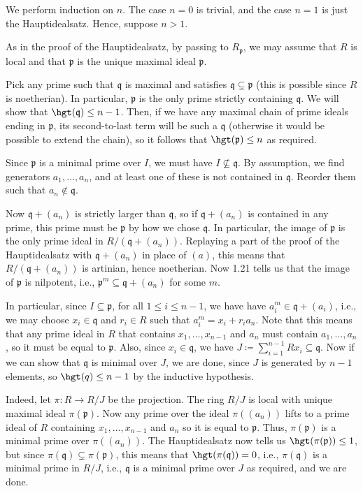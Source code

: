 We perform induction on $n$. The case $n = 0$ is trivial, and the case
$n = 1$ is just the Hauptidealsatz. Hence, suppose $n > 1$.

As in the proof of the Hauptidealsatz, by passing to $R_{\mathfrak{p}}$, we may
assume that $R$ is local and that $\mathfrak{p}$ is the unique maximal ideal
$\mathfrak{p}$.

Pick any prime such that $\mathfrak{q}$ is maximal and satisfies
$\mathfrak{q}\subsetneq \mathfrak{p}$ (this is possible since $R$ is noetherian).
In particular, $\mathfrak{p}$ is the only prime strictly containing $\mathfrak{q}$.
We will show that $\hgt(\mathfrak{q}) \leq n - 1$. Then, if we have any maximal
chain of prime ideals ending in $\mathfrak{p}$, its second-to-last term will be
such a  $\mathfrak{q}$ (otherwise it would be possible to extend the chain), so
it follows that $\hgt(\mathfrak{p})\leq n$ as required.

Since $\mathfrak{p}$ is a minimal prime over $I$, we must have $I \nsubseteq \mathfrak{q}$.
By assumption, we find generators $a_1, \ldots, a_n$, and at least one of these
is not contained in $\mathfrak{q}$. Reorder them such that $a_n\notin \mathfrak{q}$.

Now $\mathfrak{q} + (a_n)$ is strictly larger than $\mathfrak{q}$, so if
$\mathfrak{q}+(a_n)$ is contained in any prime, this prime must be $\mathfrak{p}$
by how we chose $\mathfrak{q}$. In particular, the image of $\mathfrak{p}$ is the only
prime ideal in $R/(\mathfrak{q}+(a_n))$.
Replaying a part of the proof of the Hauptidealsatz
with $\mathfrak{q} + (a_n)$ in place of $(a)$, this means that $R/(\mathfrak{q} + (a_n))$
is artinian, hence noetherian. Now 1.21 tells us that the image of $\mathfrak{p}$ is
nilpotent, i.e., $\mathfrak{p}^m \subseteq \mathfrak{q} + (a_n)$ for some $m$.

In particular, since $I \subseteq \mathfrak{p}$, for all $1\leq i\leq n-1$, we have
have $a_i^m \in \mathfrak{q} + (a_i)$, i.e., we may choose $x_i \in \mathfrak{q}$
and $r_i \in R$ such that $a_i^m = x_i + r_ia_n$. Note that this means that any
prime ideal in $R$ that contains $x_1, \ldots, x_{n-1}$ and $a_n$ must contain
$a_1, \ldots, a_n$, so it must be equal to $\mathfrak{p}$. Also, since $x_i \in \mathfrak{q}$, we have
$J\coloneqq \sum_{i=1}^{n-1} Rx_i \subseteq \mathfrak{q}$. Now if we can show that
$\mathfrak{q}$ is minimal over $J$, we are done, since $J$ is generated by
$n - 1$ elements, so $\hgt(q)\leq n-1$ by the inductive hypothesis.

Indeed, let $\pi\colon R\to R/J$ be the projection. The ring $R/J$ is local
with unique maximal ideal $\pi(\mathfrak{p})$. Now any prime over the ideal
$\pi((a_n))$ lifts to a prime ideal of $R$ containing $x_1, \ldots, x_{n-1}$ and
$a_n$ so it is equal to $\mathfrak{p}$. Thus, $\pi(\mathfrak{p})$ is a minimal
prime over $\pi((a_n))$. The Hauptidealsatz now tells us $\hgt(\pi(\mathfrak{p}))\leq 1$,
but since $\pi(\mathfrak{q}) \subsetneq \pi(\mathfrak{p})$, this means that
$\hgt(\pi(\mathfrak{q})) = 0$, i.e., $\pi(\mathfrak{q})$ is a minimal prime in
$R/J$, i.e., $\mathfrak{q}$ is a minimal prime over $J$ as required, and we are
done.
